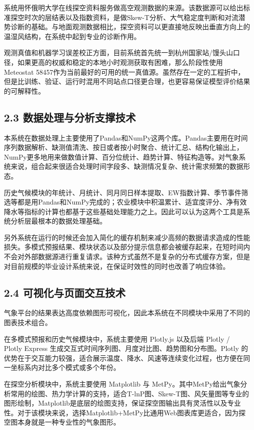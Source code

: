 系统用怀俄明大学在线探空资料服务做高空观测数据的来源。该数据源可以给出标准探空时次的层结表以及指数资料，是做Skew-T分析、大气稳定度判断和对流潜势诊断的基础。与地面观测数据相比，探空资料可以更直接地反映出垂直方向上的温湿风结构，在系统中起到专业的诊断作用。

观测真值和机器学习误差校正方面，目前系统首先统一到杭州国家站/馒头山口径，如果更高的权威和稳定的本地小时观测获取有困难，那么阶段性使用Meteostat 58457作为当前最好的可用的统一真值源。虽然存在一定的工程折中，但是比训练、验证、运行时混用不同站点口径更合理，也更容易保证模型评价结果的可解释性。

\subsection{2.3 数据处理与分析支撑技术}

本系统在数据处理上主要使用了Pandas和NumPy这两个库。Pandas主要用在时间序列数据解析、缺测值清洗、按日或者按小时聚合、统计汇总、结构化输出上，NumPy更多地用来做数值计算、百分位统计、趋势计算、特征构造等。对气象系统来说，组合起来很适合处理时间字段多、缺测情况复杂、统计需求频繁的数据形态。

历史气候模块的年统计、月统计、同月同日样本提取、EW指数计算、季节事件筛选等都是用Pandas和NumPy完成的；农业模块中积温累计、适宜度评分、净有效降水等指标的计算也都基于这些基础处理能力之上。因此可以认为这两个工具是系统分析层最根本的数据处理基础。

另外系统在运行的时候还会加入简化的缓存机制来减少高频的数据请求造成的性能损失。多模式预报结果、模块状态以及部分提示信息都会被缓存起来，在短时间内不会对外部数据源进行重复请求。该种方式虽然不是复杂的分布式缓存方案，但是对目前规模的毕业设计系统来说，在保证时效性的同时也改善了响应体验。

\subsection{2.4 可视化与页面交互技术}

气象平台的结果表达高度依赖图形可视化，因此本系统在不同模块中采用了不同的图表技术组合。

在多模式预报和历史气候模块中，系统主要使用 Plotly.js 以及后端 Plotly / Plotly Express 生成交互式时间序列图、月度对比图、趋势图和分布图。Plotly 的优势在于交互能力较强，适合展示温度、降水、风速等连续变化过程，也方便在同一坐标系内对比多个模式或多个年份。

在探空分析模块中，系统主要使用 Matplotlib 与 MetPy。其中MetPy给出气象分析常用的绘图、热力学计算的支持，适合T-lnP图、Skew-T图、风矢量图等专业的图形绘制，Matplotlib是底层的绘图支持，保证探空图输出具有灵活性以及专业性。对于该模块来说，选择Matplotlib+MetPy比通用Web图表库更适合，因为探空图本身就是一种专业性的气象图形。

